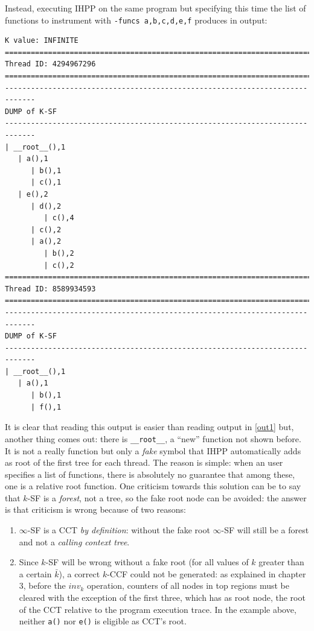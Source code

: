 \documentclass[a4paper,10pt]{report}
\begin{document}
\renewcommand{\labelitemi}{$\bullet$}
\noindent
Instead, executing IHPP on the same program but specifying this time the list 
of functions to instrument with \verb|-funcs a,b,c,d,e,f| produces in output:

\begin{lstlisting}[label=out2, 
caption={The output of IHPP run with selective tracing}, frame=bottomline]
K value: INFINITE
=============================================================================
Thread ID: 4294967296
=============================================================================
-----------------------------------------------------------------------------
DUMP of K-SF
-----------------------------------------------------------------------------
| __root__(),1
   | a(),1
      | b(),1
      | c(),1
   | e(),2
      | d(),2
         | c(),4
      | c(),2
      | a(),2
         | b(),2
         | c(),2
=============================================================================
Thread ID: 8589934593
=============================================================================
-----------------------------------------------------------------------------
DUMP of K-SF
-----------------------------------------------------------------------------
| __root__(),1
   | a(),1
      | b(),1
      | f(),1
\end{lstlisting}
\noindent
It is clear that reading this output is easier than reading output in \cref{out1} but,
another thing comes out: there is \verb|__root__|, a ``new'' function not shown before.
It is not a really function but only a \emph{fake} symbol that IHPP automatically adds
as root of the first tree for each thread. The reason is simple: when an user specifies 
a list of functions, there is absolutely no guarantee that among these, one is a relative root function.
One criticism towards this solution can be to say that $k$-SF is a \emph{forest}, not a tree, so the fake root node can be avoided: the answer is that criticism is wrong because of two reasons:
\begin{enumerate}
\item $\infty$-SF is a CCT \emph{by definition}: without the fake root $\infty$-SF will still be a forest and not a \emph{calling context tree}. 
\item Since $k$-SF will be wrong without a fake root (for all values of $k$ greater than a certain $\bar{k}$), a correct $k$-CCF could not be generated: as explained in chapter 3, before the $inv_k$ operation, counters of all nodes
in top regions must be cleared with the exception of the first three, which has as root node, the root of the CCT relative to the program execution trace. In the example above,
neither \verb|a()| nor \verb|e()| is eligible as CCT's root.
\end{enumerate}
\end{document}
